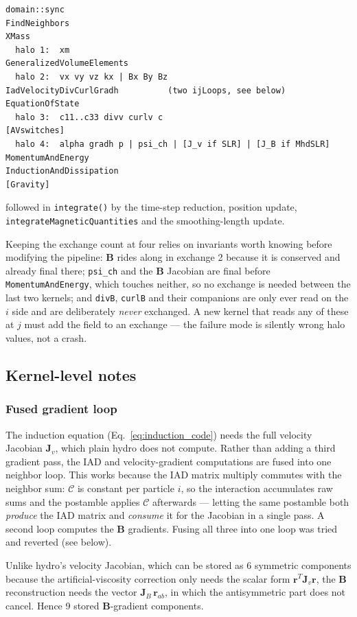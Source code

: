 \begin{verbatim}
domain::sync
FindNeighbors
XMass
  halo 1:  xm
GeneralizedVolumeElements
  halo 2:  vx vy vz kx | Bx By Bz
IadVelocityDivCurlGradh          (two ijLoops, see below)
EquationOfState
  halo 3:  c11..c33 divv curlv c
[AVswitches]
  halo 4:  alpha gradh p | psi_ch | [J_v if SLR] | [J_B if MhdSLR]
MomentumAndEnergy
InductionAndDissipation
[Gravity]
\end{verbatim}

followed in \texttt{integrate()} by the time-step reduction, position update, \texttt{integrateMagneticQuantities} and the smoothing-length update.

Keeping the exchange count at four relies on invariants worth knowing before modifying the pipeline: $\mathbf{B}$ rides along in exchange 2 because it is conserved and already final there; \texttt{psi\_ch} and the $\mathbf{B}$ Jacobian are final before \texttt{MomentumAndEnergy}, which touches neither, so no exchange is needed between the last two kernels; and \texttt{divB}, \texttt{curlB} and their companions are only ever read on the $i$ side and are deliberately \emph{never} exchanged. A new kernel that reads any of these at $j$ must add the field to an exchange --- the failure mode is silently wrong halo values, not a crash.

\subsection{Kernel-level notes}
\label{sec:appendix_kernel_notes}

\subsubsection*{Fused gradient loop}
The induction equation (Eq.~\ref{eq:induction_code}) needs the full velocity Jacobian $\mathbf{J}_v$, which plain hydro does not compute. Rather than adding a third gradient pass, the IAD and velocity-gradient computations are fused into one neighbor loop. This works because the IAD matrix multiply commutes with the neighbor sum: $\mathcal{C}$ is constant per particle $i$, so the interaction accumulates raw sums and the postamble applies $\mathcal{C}$ afterwards --- letting the same postamble both \emph{produce} the IAD matrix and \emph{consume} it for the Jacobian in a single pass. A second loop computes the $\mathbf{B}$ gradients. Fusing all three into one loop was tried and reverted (see below).

Unlike hydro's velocity Jacobian, which can be stored as 6 symmetric components because the artificial-viscosity correction only needs the scalar form $\mathbf{r}^T \mathbf{J}_v \mathbf{r}$, the $\mathbf{B}$ reconstruction needs the vector $\mathbf{J}_B\,\mathbf{r}_{ab}$, in which the antisymmetric part does not cancel. Hence 9 stored $\mathbf{B}$-gradient components.


